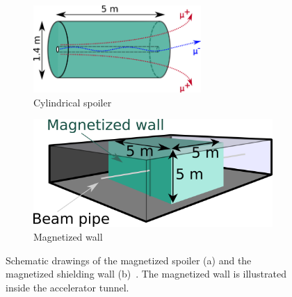 \begin{figure}
 \centering
  \begin{subfigure}[b]{0.49\textwidth}
   \centering
    \includegraphics[width=0.7\textwidth]{Figures/BDS_muons/spoilers.png}
   \caption{Cylindrical spoiler}
   \label{fig:spoilers}
   \end{subfigure}
   \hfill
    \begin{subfigure}[b]{0.49\textwidth}
   \centering
    \includegraphics[width=\textwidth]{Figures/BDS_muons/muon_wall.png}
   \caption{Magnetized wall}
   \label{fig:muon_wall}
   \end{subfigure}
   \caption[BDS muon shielding options]{Schematic drawings of the magnetized spoiler (a) and the magnetized shielding wall (b)~\cite[cf. p. 2]{MuonShielding}.
   The magnetized wall is illustrated inside the accelerator tunnel.}
   \label{fig:BDS_Muons:shielding_options}
 \end{figure}


